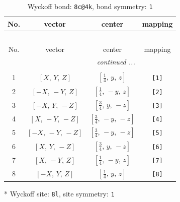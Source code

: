 \documentclass[fleqn,8pt]{jsarticle}
\begin{document}
\renewcommand{\arraystretch}{1.2}
\begin{longtable}{cccc}
\caption{Wyckoff bond: {\tt 8c@4k}, bond symmetry: {\tt 1}}
 \\
 \hline \hline
No. & vector & center & mapping \\ \hline \endfirsthead

\multicolumn{3}{l}{\tablename\ \thetable{}} \\
 \hline \hline
No. & vector & center & mapping \\ \hline \endhead

 \hline \hline
\multicolumn{3}{r}{\footnotesize\it continued ...} \\ \endfoot

 \hline \hline
\multicolumn{3}{r}{} \\ \endlastfoot

1 & $\left[ X,\, Y,\, Z \right]$ & $\left[ \frac{1}{4},\, y,\, z \right]$ & {\tt [1]} \\ \hline
2 & $\left[ - X,\, - Y,\, Z \right]$ & $\left[ \frac{1}{4},\, - y,\, z \right]$ & {\tt [2]} \\ \hline
3 & $\left[ - X,\, Y,\, - Z \right]$ & $\left[ \frac{3}{4},\, y,\, - z \right]$ & {\tt [3]} \\ \hline
4 & $\left[ X,\, - Y,\, - Z \right]$ & $\left[ \frac{3}{4},\, - y,\, - z \right]$ & {\tt [4]} \\ \hline
5 & $\left[ - X,\, - Y,\, - Z \right]$ & $\left[ \frac{3}{4},\, - y,\, - z \right]$ & {\tt [5]} \\ \hline
6 & $\left[ X,\, Y,\, - Z \right]$ & $\left[ \frac{3}{4},\, y,\, - z \right]$ & {\tt [6]} \\ \hline
7 & $\left[ X,\, - Y,\, Z \right]$ & $\left[ \frac{1}{4},\, - y,\, z \right]$ & {\tt [7]} \\ \hline
8 & $\left[ - X,\, Y,\, Z \right]$ & $\left[ \frac{1}{4},\, y,\, z \right]$ & {\tt [8]} \\
\end{longtable}
* Wyckoff site: {\tt 8l}, site symmetry: {\tt 1}
\renewcommand{\arraystretch}{1.2}
\end{document}

